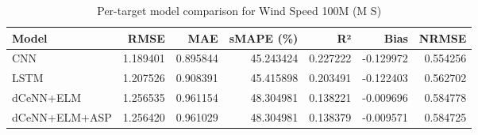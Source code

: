 \begin{table}
\caption{Per-target model comparison for Wind Speed 100M (M S)}
\begin{tabular}{lrrrrrr}
\toprule
Model & RMSE & MAE & sMAPE (\%) & R² & Bias & NRMSE \\
\midrule
CNN & 1.189401 & 0.895844 & 45.243424 & 0.227222 & -0.129972 & 0.554256 \\
LSTM & 1.207526 & 0.908391 & 45.415898 & 0.203491 & -0.122403 & 0.562702 \\
dCeNN+ELM & 1.256535 & 0.961154 & 48.304981 & 0.138221 & -0.009696 & 0.584778 \\
dCeNN+ELM+ASP & 1.256420 & 0.961029 & 48.304981 & 0.138379 & -0.009571 & 0.584725 \\
\bottomrule
\end{tabular}
\end{table}
